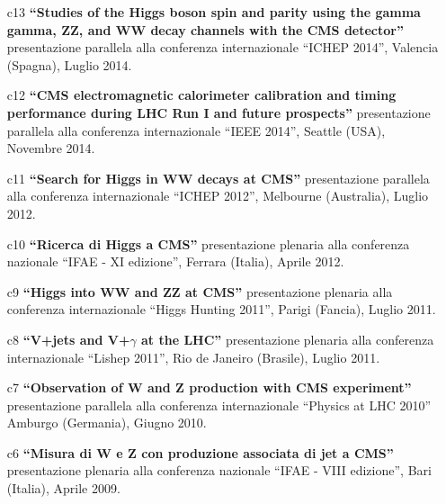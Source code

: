 \documentclass[11pt,twoside,a4paper]{article}
\begin{document}
\begin{enumerate}
\item [c13] \textbf{``Studies of the Higgs boson spin and parity using
  the gamma gamma, ZZ, and WW decay channels with the CMS detector''}
  presentazione parallela alla conferenza internazionale ``ICHEP
  2014'', Valencia (Spagna), Luglio 2014.
  \vspace{2mm}

\item [c12] \textbf{``CMS electromagnetic calorimeter calibration and
  timing performance during LHC Run I and future prospects''}
  presentazione parallela alla conferenza internazionale ``IEEE
  2014'', Seattle (USA), Novembre 2014.
  \vspace{2mm}

\item [c11] \textbf{``Search for Higgs in WW decays at CMS''}
  presentazione parallela alla conferenza internazionale ``ICHEP
  2012'', Melbourne (Australia), Luglio 2012.
  \vspace{2mm}

\item [c10] \textbf{``Ricerca di Higgs a CMS''}
  presentazione plenaria alla conferenza nazionale ``IFAE - XI edizione'',
  Ferrara (Italia), Aprile 2012.
  \vspace{2mm}

\item [c9] \textbf{``Higgs into WW and ZZ at CMS''} presentazione
  plenaria alla conferenza internazionale ``Higgs Hunting 2011'',
  Parigi (Fancia), Luglio 2011.
  \vspace{2mm}

\item [c8] \textbf{``V+jets and V+$\gamma$ at the LHC''} presentazione
  plenaria alla conferenza internazionale ``Lishep 2011'', Rio de
  Janeiro (Brasile), Luglio 2011.
  \vspace{2mm}

\item [c7] \textbf{``Observation of W and Z production with CMS
  experiment'' } presentazione parallela alla conferenza
  internazionale ``Physics at LHC 2010'' Amburgo (Germania), Giugno
  2010.
  \vspace{2mm}

\item [c6] \textbf{``Misura di W e Z con produzione associata di jet a
  CMS''} presentazione plenaria alla conferenza nazionale ``IFAE -
  VIII edizione'', Bari (Italia), Aprile 2009.
  \vspace{2mm}


\end{enumerate}
\end{document}
